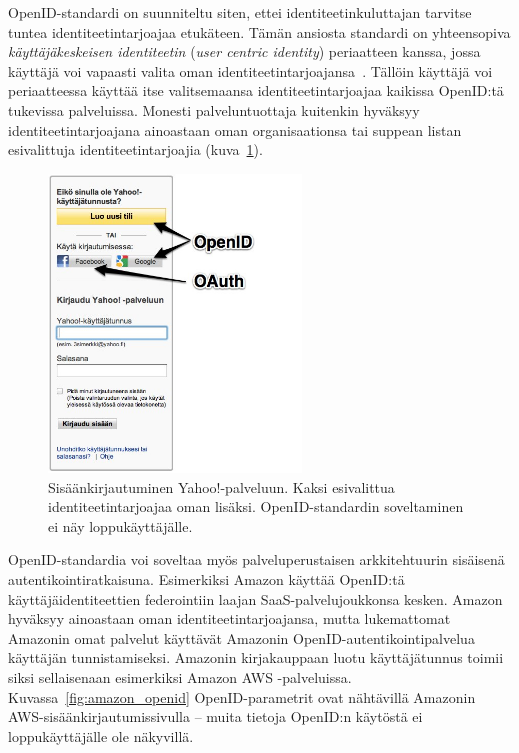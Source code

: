 \documentclass[finnish,gradu]{tktltiki}
\begin{document}
  OpenID-standardi on suunniteltu siten, ettei identiteetinkuluttajan tarvitse tuntea identiteetintarjoajaa etukäteen. Tämän ansiosta standardi on yhteensopiva \emph{käyttäjäkeskeisen identiteetin} (\emph{user centric identity}) periaatteen kanssa, jossa käyttäjä voi vapaasti valita oman identiteetintarjoajansa~\cite{openid_recordon_2009}. Tällöin käyttäjä voi periaatteessa käyttää itse valitsemaansa identiteetintarjoajaa kaikissa OpenID:tä tukevissa palveluissa.
  Monesti palveluntuottaja kuitenkin hyväksyy identiteetintarjoajana ainoastaan oman organisaationsa tai suppean listan esivalittuja identiteetintarjoajia (kuva~\ref{fig:yahoo_login}).

  \begin{figure}[h!]
    \centering
    \includegraphics[width=0.6\textwidth]{images/yahoo_login.jpg}
    \caption[Yahoo!-palvelun sisäänkirjautumissivu.]{Sisäänkirjautuminen Yahoo!-palveluun. Kaksi esivalittua identiteetintarjoajaa oman lisäksi. OpenID-standardin soveltaminen ei näy loppukäyttäjälle.}
    \label{fig:yahoo_login}
  \end{figure}

  OpenID-standardia voi soveltaa myös palveluperustaisen arkkitehtuurin sisäisenä autentikointiratkaisuna. Esimerkiksi Amazon käyttää OpenID:tä käyttäjäidentiteettien federointiin laajan SaaS-palvelujoukkonsa kesken. Amazon hyväksyy ainoastaan oman identiteetintarjoajansa, mutta lukemattomat Amazonin omat palvelut käyttävät Amazonin OpenID-autentikointipalvelua käyttäjän tunnistamiseksi. Amazonin kirjakauppaan luotu käyttäjätunnus toimii siksi sellaisenaan esimerkiksi Amazon AWS -palveluissa. Kuvassa~\ref{fig:amazon_openid} OpenID-parametrit ovat nähtävillä Amazonin AWS-sisäänkirjautumissivulla -- muita tietoja OpenID:n käytöstä ei loppukäyttäjälle ole näkyvillä.
\end{document}
